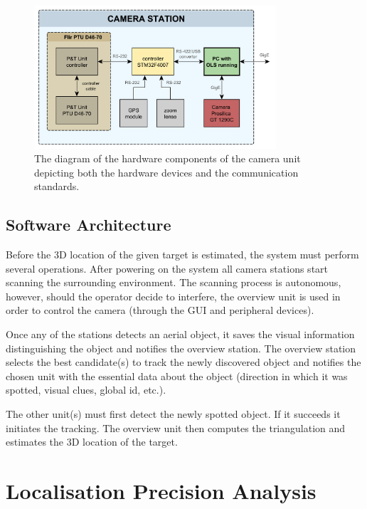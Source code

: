 \begin{figure}[htb]
	\centering
	\includegraphics[width=9cm]{fig/hw_camera_unit.pdf}
	\caption{The diagram of the hardware components of the camera unit depicting both the hardware devices and the communication standards.}
	\label{fig:hw_camera_unit}
\end{figure}

\section{Software Architecture}

Before the 3D location of the given target is estimated, the system must perform several operations. After powering on the system all camera stations start scanning the surrounding environment. The scanning process is autonomous, however, should the operator decide to interfere, the overview unit is used in order to control the camera (through the GUI and peripheral devices). 

Once any of the stations detects an aerial object, it saves the visual information distinguishing the object and notifies the overview station. The overview station selects the best candidate(s) to track the newly discovered object and notifies the chosen unit with the essential data about the object (direction in which it was spotted, visual clues, global id, etc.).

The other unit(s) must first detect the newly spotted object. If it succeeds it initiates the tracking. The overview unit then computes the triangulation and estimates the 3D location of the target.

\chapter{Localisation Precision Analysis}

